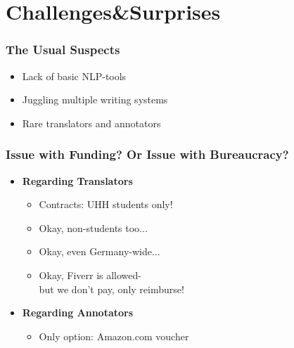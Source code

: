 \documentclass[aspectratio=169]{beamer}
\begin{document}
\section{Challenges\&Surprises}

\begin{frame}[fragile]
	\frametitle{The Usual Suspects}
    \begin{itemize}
        \item Lack of basic NLP-tools
        \item Juggling multiple writing systems
        \item Rare translators and annotators
    \end{itemize}
\end{frame}


\begin{frame}[fragile]
	\frametitle{Issue with Funding? Or Issue with Bureaucracy?}
    \begin{minipage}{.40\textwidth}
        \centering
        \begin{itemize}
            \item \textbf{Regarding Translators}
            \begin{itemize}
                \item Contracts: UHH students only!
                \item Okay, non-students too...
                \item Okay, even Germany-wide...
                \item Okay, Fiverr is allowed- \\ but we don't pay, only reimburse!
            \end{itemize}
            \item \textbf{Regarding Annotators}
            \begin{itemize}
                \item Only option: Amazon.com voucher
            \end{itemize}
        \end{itemize}
    \end{minipage}%
    \begin{minipage}{.60\textwidth}
    \centering
        \begin{figure}

\end{figure}
\end{minipage}
\end{frame}
\end{document}
